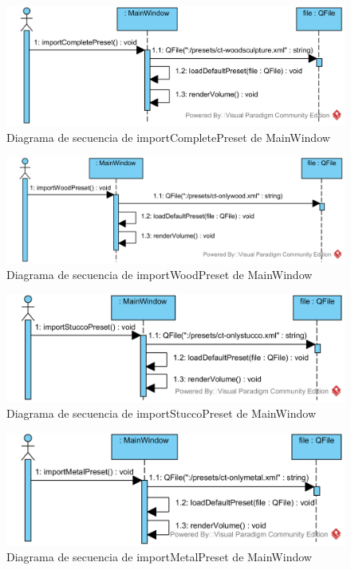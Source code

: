 \begin{figure}[H]
	\centering
	\includegraphics[width=12cm]{imagenes/diagramas/secuencia/MainWindow_ImportCompletePreset}
	\caption{Diagrama de secuencia de importCompletePreset de MainWindow}
	\label{fig:diagrama_secuencia_mainWindow_importCompletePreset}
\end{figure}

\begin{figure}[H]
	\centering
	\includegraphics[width=12cm]{imagenes/diagramas/secuencia/MainWindow_ImportWoodPreset}
	\caption{Diagrama de secuencia de importWoodPreset de MainWindow}
	\label{fig:diagrama_secuencia_mainWindow_importWoodPreset}
\end{figure}

\begin{figure}[H]
	\centering
	\includegraphics[width=12cm]{imagenes/diagramas/secuencia/MainWindow_ImportStuccoPreset}
	\caption{Diagrama de secuencia de importStuccoPreset de MainWindow}
	\label{fig:diagrama_secuencia_mainWindow_importStuccoPreset}
\end{figure}

\begin{figure}[H]
	\centering
	\includegraphics[width=12cm]{imagenes/diagramas/secuencia/MainWindow_ImportMetalPreset}
	\caption{Diagrama de secuencia de importMetalPreset de MainWindow}
	\label{fig:diagrama_secuencia_mainWindow_importMetalPreset}
\end{figure}

